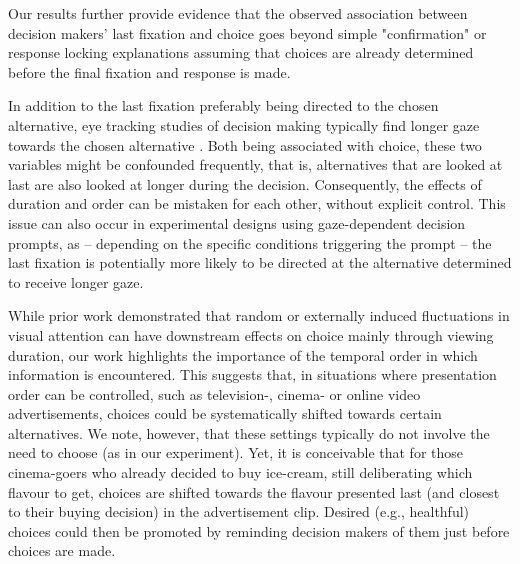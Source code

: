\documentclass[11pt, a4paper, twocolumn, abstract]{scrartcl}
\begin{document}
Our results further provide evidence that the observed association between decision makers' last fixation and choice goes beyond simple "confirmation" or response locking explanations assuming that choices are already determined before the final fixation and response is made.


In addition to the last fixation preferably being directed to the chosen alternative, eye tracking studies of decision making typically find longer gaze towards the chosen alternative \parencite{shimojo2003GazeBiasBoth,fiedler2012DynamicsDecisionMaking,krajbich2010VisualFixationsComputation,krajbich2011MultialternativeDriftdiffusionModel,glickman2019FormationPreferenceRisky,cavanagh2014EyeTrackingPupillometry,stewart2016EyeMovementsRisky,molter2021GazedependentEvidenceAccumulation}. Both being associated with choice, these two variables might be confounded frequently, that is, alternatives that are looked at last are also looked at longer during the decision. Consequently, the effects of duration and order can be mistaken for each other, without explicit control.
This issue can also occur in experimental designs using gaze-dependent decision prompts, as – depending on the specific conditions triggering the prompt – the last fixation is potentially more likely to be directed at the alternative determined to receive longer gaze.


While prior work demonstrated that random or externally induced fluctuations in visual attention can have downstream effects on choice mainly through viewing duration, our work highlights the importance of the temporal order in which information is encountered. This suggests that, in situations where presentation order can be controlled, such as television-, cinema- or online video advertisements, choices could be systematically shifted towards certain alternatives. We note, however, that these settings typically do not involve the need to choose (as in our experiment). Yet, it is conceivable that for those cinema-goers who already decided to buy ice-cream, still deliberating which flavour to get, choices are shifted towards the flavour presented last (and closest to their buying decision) in the advertisement clip. Desired (e.g., healthful) choices could then be promoted by reminding decision makers of them just before choices are made.
\end{document}
